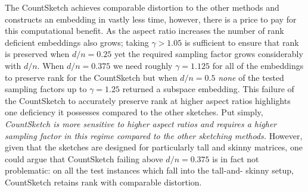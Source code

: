 The CountSketch achieves comparable distortion to the other methods and constructs
an embedding in vastly less time, however, there is a price to pay for this
computational benefit.
As the aspect ratio increases the number of rank deficient embeddings also
grows; taking $\gamma > 1.05$ is sufficient to ensure that rank is preserved
when $d/n=0.25$ yet the required sampling factor grows considerably with $d/n$.
When $d/n=0.375$ we need roughly $\gamma = 1.125$ for all of the embeddings to
preserve rank for the CountSketch but when $d/n = 0.5$ \textit{none} of the
tested sampling factors up to $\gamma=1.25$ returned a subspace embedding.
This failure of the CountSketch to accurately preserve rank at higher aspect
ratios highlights one deficiency it possesses compared to the other sketches.
Put simply, \textit{CountSketch is more sensitive to higher aspect ratios and
requires a higher sampling factor in this regime compared to the other
sketching methods.}
However, given that the sketches are designed for particularly tall and skinny
matrices, one could argue that CountSketch failing above $d/n = 0.375$ is in
fact not problematic: on all the test instances which fall into the tall-and-
skinny setup, CountSketch retains rank with comparable distortion.

